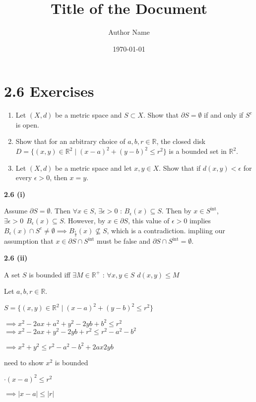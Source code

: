 \documentclass{article}
\title{\textbf{Title of the Document}}
\author{Author Name}
\date{\today}
\theoremstyle{definition}
\numberwithin{equation}{section}
\begin{document}
\maketitle
\tableofcontents
\newpage
\section*{2.6 Exercises}

\begin{enumerate}
    \item Let $(X,d)$ be a metric space and $S \subset X$. Show that $\partial S = \emptyset$ if and only if $S^c$ is open.
    \item Show that for an arbitrary choice of $a,b,r \in \mathbb{R}$, the closed disk $D = \{(x,y) \in \mathbb{R}^2 \mid (x-a)^2 + (y-b)^2 \leq r^2\}$ is a bounded set in $\mathbb{R}^2$.
    \item Let $(X,d)$ be a metric space and let $x,y \in X$. Show that if $d(x,y) < \epsilon$ for every $\epsilon > 0$, then $x = y$.
\end{enumerate}

\bigskip
\noindent\textbf{2.6 (i)}

Assume $\partial S = \emptyset$. Then $\forall x \in S$, $\exists \epsilon > 0$ : $B_\epsilon(x) \subseteq S$.
Then by $x \in S^{\text{int}}$, $\exists \epsilon > 0\ \ B_\epsilon(x) \subseteq S$.
However, by $x \in \partial S$, this value of $\epsilon > 0$ implies $B_\epsilon(x) \cap S^c \neq \emptyset \implies B_{\frac{\epsilon}{2}}(x) \not\subseteq S$, which is a contradiction.
impliing our assumption that $x \in \partial S \cap S^{\text{int}}$ must be false and 
$\partial S \cap S^{\text{int}} = \emptyset$.

\bigskip
\noindent\textbf{2.6 (ii)}

A set $S$ is bounded iff $\exists  M \in \mathbb{R}^+$ : $\forall x, y \in  S$ 
$d(x,y) \leq M$ 

Let $a,b,r \in \mathbb{R}$.

$S = \{ (x,y) \in \mathbb{R}^2 \mid (x-a)^2 + (y-b)^2 \leq r^2 \}$ 

$\implies x^2 - 2ax + a^2+ y^2 - 2yb + b^2 \leq r^2$
$\implies x^2 - 2ax + y^2 - 2yb + r^2 \leq r^2 - a^2 - b^2$ 

$\implies x^2 + y^2 \leq r^2 - a^2 - b^2 + 2 a x 2 yb $

need to show $x^2$ is bounded

$\cdot   (x-a)^2 \leq r^2$

$\implies |x-a|\leq| r| $
\end{document}
